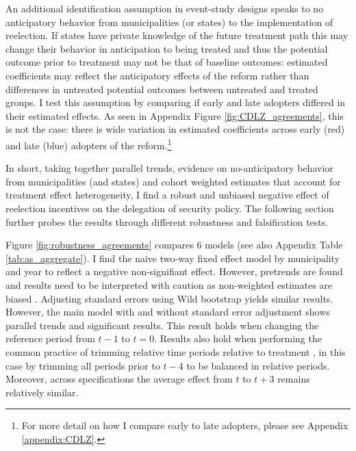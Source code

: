 \documentclass[12pt]{amsart}
\makeatletter
\def\section{\@startsection{section}{1}
	\z@{1.0\linespacing\@plus\linespacing}{.5\linespacing}{\Large}}
\numberwithin{equation}{section}
\theoremstyle{definition}
\theoremstyle{definition}
\theoremstyle{definition}
\makeatother
\begin{document}
An additional identification assumption in event-study designs speaks to no anticipatory behavior from municipalities (or states) to the implementation of reelection. If states have private knowledge of the future treatment path this may change their behavior in anticipation to being treated and thus the potential outcome prior to treatment may not be that of baseline outcomes: estimated coefficients may reflect the anticipatory effects of the reform rather than differences in untreated potential outcomes between untreated and treated groups. %
I test this assumption by comparing if early and late adopters differed in their estimated effects. As seen in Appendix Figure \ref{fig:CDLZ_agreements}, this is not the case: there is wide variation in estimated coefficients across early (red) and late (blue) adopters of the reform.\footnote{For more detail on how I compare early to late adopters, please see Appendix \ref{appendix:CDLZ}.}  

In short, taking together parallel trends, evidence on no-anticipatory behavior from municipalities (and states) and cohort weighted estimates that account for treatment effect heterogeneity, I find a robust and unbiased negative effect of reelection incentives on the delegation of security policy.  The following section further probes the results through different robustness and falsification tests.
         

\section{Robustness \label{sec:robustness}}
 
  Figure \ref{fig:robustness_agreements} compares 6 models (see also Appendix Table \ref{tab:as_aggregate}). I find the naive two-way fixed effect model by municipality and year to reflect a negative non-signifiant effect. However, pretrends are found and results need to be interpreted with caution as non-weighted estimates are biased \citep{abraham_sun_2020}. Adjusting standard errors using Wild bootstrap yields similar results. However, the main model with and without standard error adjustment shows parallel trends and significant results. This result holds when changing the reference period from $t-1$ to $t=0$. Results also hold when performing the common practice of trimming relative time periods relative to treatment \citep{borusyak_2017, dobkin_etal_2018}, in this case by trimming all periods prior to $t-4$ to be balanced in relative periods. Moreover, across specifications the average effect from $t$ to $t+3$ remains relatively similar. %
        
\end{document}
